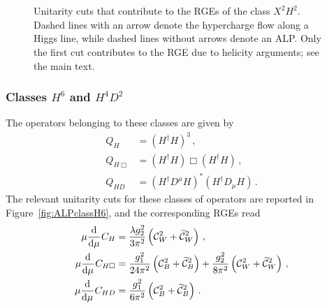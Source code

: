 \begin{figure}[h!tb]
\begin{tikzpicture}
	\end{tikzpicture}
    \hfill 
	\,
	\,
\caption[Unitarity cuts for the renormalization of the class $X^2H^2$]{Unitarity cuts that contribute to the RGEs of the class $X^2H^2$. Dashed lines with an
arrow denote the hypercharge flow along a Higgs line, while dashed lines without arrows denote
an ALP. Only the first cut contributes to the RGE due to helicity arguments; see the main
text.}
\label{fig:ALPclassX2H2}
\end{figure}

\subsubsection{\texorpdfstring{Classes $H^6$ and $H^4D^2$}{Classes H6 and H4D2}}

The operators belonging to these classes are given by
\begin{align}
Q_H &= (H^\dagger H)^3\,, \\
Q_{H\Box} &= (H^\dagger H)\Box(H^\dagger H)\,, \\
Q_{HD} &= (H^\dagger D^\mu H)^*(H^\dagger D_\mu H)\,.
\end{align}
The relevant unitarity cuts for these classes of operators are reported in
Figure~\ref{fig:ALPclassH6}, and the corresponding RGEs read
\begin{align}
\mu \dv[]{}{\mu} {C}_{H} &= \frac{\lambda  g_2^2}{3\pi^2}  \left(\mathcal{C}_{W}^2+ \widetilde{\mathcal{C}}_{W}^2 \right)\,,  \\
\mu \dv[]{}{\mu} {C}_{H\Box} &= \frac{g_1^2}{24\pi^2}   \left(\mathcal{C}_{B}^2+ \widetilde{\mathcal{C}}_{B}^2\right)+ \frac{g_2^2}{8\pi^2}  \left(\mathcal{C}_{W}^2+ \widetilde{\mathcal{C}}_{W}^2\right)\,, \\
\mu \dv[]{}{\mu} {C}_{HD} &= \frac{g_1^2}{6\pi^2}   \left (\mathcal{C}_{B}^2+ \widetilde{\mathcal{C}}_{B}^2 \right)\,.
\end{align}

